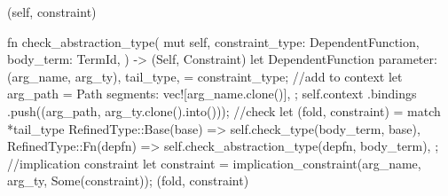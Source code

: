 \documentclass[
  oneside,
  english,
  coorientadorbanca,
  noabntexcite
]{ufsc-thesis-rn46-2019}
\begin{document}
\begin{rustcode}
{{        (self, constraint)
    }

    fn check_abstraction_type(
        mut self,
        constraint_type: DependentFunction,
        body_term: TermId,
    ) -> (Self, Constraint) {
        let DependentFunction {
            parameter: (arg_name, arg_ty),
            tail_type,
        } = constraint_type;
        //add to context
        let arg_path = Path {
            segments: vec![arg_name.clone()],
        };
        self.context
            .bindings
            .push((arg_path, arg_ty.clone().into()));
        //check
        let (fold, constraint) = match *tail_type {
            RefinedType::Base(base) => self.check_type(body_term, base),
            RefinedType::Fn(depfn) => self.check_abstraction_type(depfn, body_term),
        };
        //implication constraint
        let constraint = implication_constraint(arg_name, arg_ty, Some(constraint));
        (fold, constraint)
    }

}
\end{rustcode}
\end{document}
